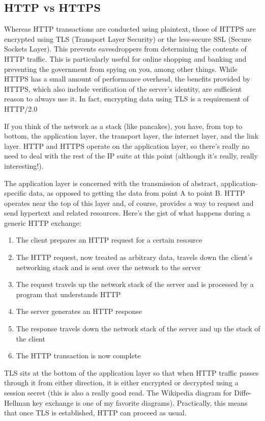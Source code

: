 \documentclass[12pt]{article}
\begin{document}
\subsection{HTTP vs HTTPS}
Whereas HTTP transactions are conducted using plaintext, those of HTTPS are encrypted using TLS (Transport Layer Security) or the less-secure SSL (Secure Sockets Layer). This prevents eavesdroppers from determining the contents of HTTP traffic. This is particularly useful for online shopping and banking and preventing the government from spying on you, among other things. While HTTPS has a small amount of performance overhead, the benefits provided by HTTPS, which also include verification of the server's identity, are sufficient reason to always use it. In fact, encrypting data using TLS is a requirement of HTTP/2.0
\par
If you think of the network as a stack (like pancakes), you have, from top to bottom, the application layer, the transport layer, the internet layer, and the link layer. HTTP and HTTPS operate on the application layer, so there's really no need to deal with the rest of the IP suite at this point (although it's really, really interesting!).
\par
The application layer is concerned with the transmission of abstract, application-specific data, as opposed to getting the data from point A to point B. HTTP operates near the top of this layer and, of course, provides a way to request and send hypertext and related resources. Here's the gist of what happens during a generic HTTP exchange: 
\begin{enumerate}
\item The client prepares an HTTP request for a certain resource
\item The HTTP request, now treated as arbitrary data, travels down the client's networking stack and is sent over the network to the server
\item The request travels up the network stack of the server and is processed by a program that understands HTTP
\item The server generates an HTTP response
\item The response travels down the network stack of the server and up the stack of the client
\item The HTTP transaction is now complete
\end{enumerate}
TLS sits at the bottom of the application layer so that when HTTP traffic passes through it from either direction, it is either encrypted or decrypted using a session secret (this is also a really good read. The Wikipedia diagram for Diffe-Hellman key exchange is one of my favorite diagrams). Practically, this means that once TLS is established, HTTP can proceed as usual.
\end{document}
